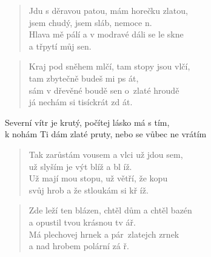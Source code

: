 \begin{song}{}
\begin{verse}
   Jdu s děravou patou, mám horečku zlatou, \\
   jsem chudý, jsem sláb, nemoce n. \\
   Hlava mě pálí a v modravé dáli se le skne \\
   a třpytí můj sen.
\end{verse}
\begin{verse}
   Kraj pod sněhem mlčí, tam stopy jsou vlčí,  \\
   tam zbytečně budeš mi ps át, \\
   sám v dřevěné boudě sen o~zlaté hroudě \\
   já nechám si tisíckrát zd át.
\end{verse}
\begin{refren}
   Severní vítr je krutý, počítej lásko má s tím,  \\
   k nohám Ti dám zlaté pruty, nebo se vůbec ne vrátím
\end{refren}
\begin{verse}
   Tak zarůstám vousem a vlci už jdou sem, \\
   už slyším je výt blíž a bl íž. \\
   Už mají mou stopu, už větří, že kopu \\
   svůj hrob a že stloukám si kř íž.
\end{verse}
\begin{verse}
   Zde leží ten blázen, chtěl dům a chtěl bazén \\
   a opustil tvou krásnou tv ář. \\
   Má plechovej hrnek a pár~zlatejch zrnek \\
   a nad hrobem polární zá ř. 
\end{verse}
\end{song}
\pagebreak
